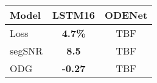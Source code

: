 \newcommand{\modelNameCellWidth}{1.8cm}
    \begin{tabular}{@{} l | c c @{}}
        \toprule
        Model & LSTM16 & ODENet \\ \midrule
        Loss    & \textbf{4.7\%} & TBF \\
        segSNR  & \textbf{8.5} & TBF  \\
        ODG     & \textbf{-0.27} & TBF \\ \bottomrule
    \end{tabular}%
    